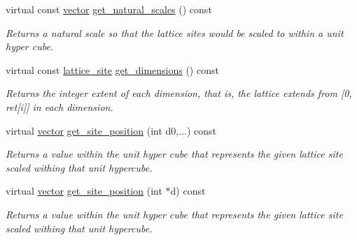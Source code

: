 \begin{DoxyCompactItemize}
\mbox{\label{classsisl_1_1cartesian__cubic_a52c6c0f97e7cb5dd2ead2c0a2a94e150}} 
virtual const \hyperlink{namespacesisl_a2069bd5374a9be042ff3ce3306d41e1a}{vector} \hyperlink{classsisl_1_1cartesian__cubic_a52c6c0f97e7cb5dd2ead2c0a2a94e150}{get\+\_\+natural\+\_\+scales} () const
\begin{DoxyCompactList}\small\item\em Returns a natural scale so that the lattice sites would be scaled to within a unit hyper cube. \end{DoxyCompactList}\item 
\mbox{\label{classsisl_1_1cartesian__cubic_a4a578c3edf518c565288cfc2d15fcd67}} 
virtual const \hyperlink{namespacesisl_acd18feee4026583db6185df2b25434aa}{lattice\+\_\+site} \hyperlink{classsisl_1_1cartesian__cubic_a4a578c3edf518c565288cfc2d15fcd67}{get\+\_\+dimensions} () const
\begin{DoxyCompactList}\small\item\em Returns the integer extent of each dimension, that is, the lattice extends from \mbox{[}0, ret\mbox{[}i\mbox{]}\mbox{]} in each dimension. \end{DoxyCompactList}\item 
\mbox{\label{classsisl_1_1cartesian__cubic_ae4e02a25d580cad2e1475c14de4e1775}} 
virtual \hyperlink{namespacesisl_a2069bd5374a9be042ff3ce3306d41e1a}{vector} \hyperlink{classsisl_1_1cartesian__cubic_ae4e02a25d580cad2e1475c14de4e1775}{get\+\_\+site\+\_\+position} (int d0,...) const
\begin{DoxyCompactList}\small\item\em Returns a value within the unit hyper cube that represents the given lattice site scaled withing that unit hypercube. \end{DoxyCompactList}\item 
\mbox{\label{classsisl_1_1cartesian__cubic_a8737f47b33d8627a262ef6cd3682b259}} 
virtual \hyperlink{namespacesisl_a2069bd5374a9be042ff3ce3306d41e1a}{vector} \hyperlink{classsisl_1_1cartesian__cubic_a8737f47b33d8627a262ef6cd3682b259}{get\+\_\+site\+\_\+position} (int $\ast$d) const
\begin{DoxyCompactList}\small\item\em Returns a value within the unit hyper cube that represents the given lattice site scaled withing that unit hypercube. \end{DoxyCompactList}\item 

\end{DoxyCompactItemize}
